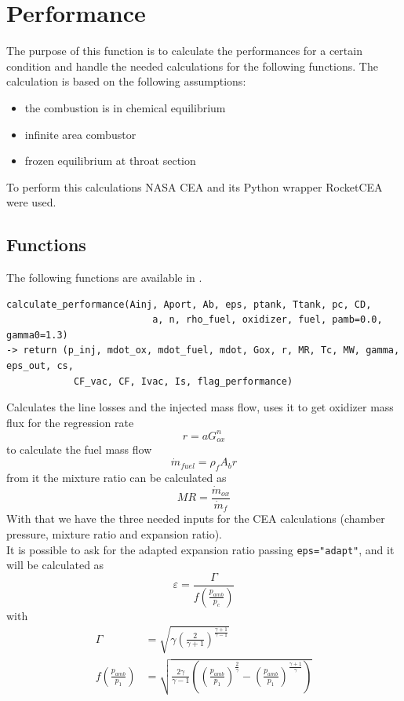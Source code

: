 \newpage
\chapter{Performance}
The purpose of this function is to calculate the performances for a certain condition and handle the needed calculations for the following functions.
The calculation is based on the following assumptions: 
\begin{itemize}
	\item the combustion is in chemical equilibrium
	\item infinite area combustor
	\item frozen equilibrium at throat section
\end{itemize}
To perform this calculations NASA CEA \cite{NASACEA} and its Python wrapper
RocketCEA \cite{RocketCEA} were used.
\section{Functions}
The following functions are available in .
\begin{verbatim}
calculate_performance(Ainj, Aport, Ab, eps, ptank, Ttank, pc, CD,
                          a, n, rho_fuel, oxidizer, fuel, pamb=0.0, gamma0=1.3)
-> return (p_inj, mdot_ox, mdot_fuel, mdot, Gox, r, MR, Tc, MW, gamma, eps_out, cs,
            CF_vac, CF, Ivac, Is, flag_performance)
\end{verbatim}
\hspace{2em} Calculates the line losses and the injected mass flow, uses it to get oxidizer mass flux for the regression rate
\begin{equation}
	r=aG_{ox}^n
\end{equation}
to calculate the fuel mass flow
\begin{equation}
	\dot{m}_{fuel}=\rho_f A_b r
\end{equation}
from it the mixture ratio can be calculated as
\begin{equation}
	MR=\frac{\dot{m}_{ox}}{\dot{m}_{f}}
\end{equation}
With that we have the three needed inputs for the CEA calculations (chamber pressure, mixture ratio and expansion ratio).\\
It is possible to ask for the adapted expansion ratio passing \verb|eps="adapt"|, and it will be calculated as
\begin{equation}
	\varepsilon = \frac{\Gamma}{f(\frac{p_{amb}}{p_c})}
\end{equation}
with
\begin{align*}
	\Gamma&=\sqrt{\gamma (\frac{2}{\gamma +1})^\frac{\gamma +1}{\gamma -1}}\\
	f(\frac{p_{amb}}{p_1})&=\sqrt{\frac{2\gamma}{\gamma -1}((\frac{p_{amb}}{p_1})^\frac{2}{\gamma}-(\frac{p_{amb}}{p_1})^\frac{\gamma +1}{\gamma})}
\end{align*}

